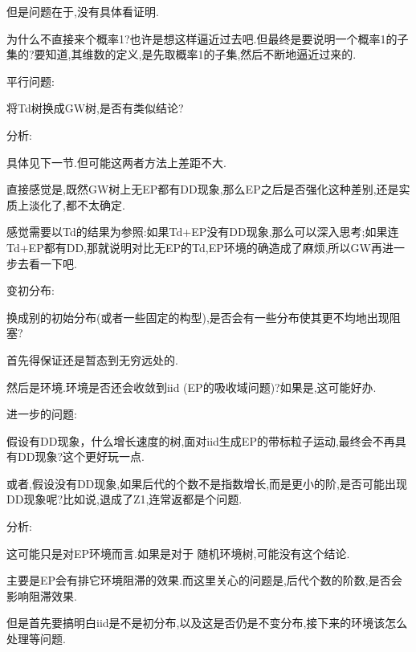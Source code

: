 \documentclass[a4paper,oneside]{ctexbook}
\begin{document}
							但是问题在于,没有具体看证明.

							为什么不直接来个概率1?也许是想这样逼近过去吧.但最终是要说明一个概率1的子集的?要知道,其维数的定义,是先取概率1的子集,然后不断地逼近过来的.	

				平行问题:

					\begin{que}

						将Td树换成GW树,是否有类似结论?
					
					\end{que}

					分析:

						具体见下一节.但可能这两者方法上差距不大.

						直接感觉是,既然GW树上无EP都有DD现象,那么EP之后是否强化这种差别,还是实质上淡化了,都不太确定.

						感觉需要以Td的结果为参照:如果Td+EP没有DD现象,那么可以深入思考;如果连Td+EP都有DD,那就说明对比无EP的Td,EP环境的确造成了麻烦,所以GW再进一步去看一下吧.

				变初分布:

					\begin{que}

						换成别的初始分布(或者一些固定的构型),是否会有一些分布使其更不均地出现阻塞?
					
					\end{que}

					首先得保证还是暂态到无穷远处的.

					然后是环境.环境是否还会收敛到iid (EP的吸收域问题)?如果是,这可能好办.


				进一步的问题:

					\begin{que}[更多或更少的后代是否抵消或产生DD现象]

						假设有DD现象，什么增长速度的树,面对iid生成EP的带标粒子运动,最终会不再具有DD现象?这个更好玩一点.

						或者,假设没有DD现象,如果后代的个数不是指数增长,而是更小的阶,是否可能出现DD现象呢?比如说,退成了Z1,连常返都是个问题.
					
					\end{que}

					分析:

						这可能只是对EP环境而言.如果是对于 随机环境树,可能没有这个结论.

							主要是EP会有排它环境阻滞的效果.而这里关心的问题是,后代个数的阶数,是否会影响阻滞效果.

							但是首先要搞明白iid是不是初分布,以及这是否仍是不变分布,接下来的环境该怎么处理等问题.
\end{document}
